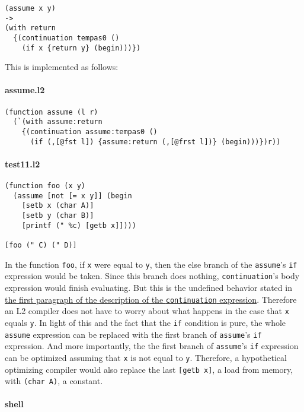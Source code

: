 \documentclass[]{article}
\let\oldparagraph\paragraph
\renewcommand{\paragraph}[1]{\oldparagraph{#1}\mbox{}}
\begin{document}
\begin{verbatim}
(assume x y)
->
(with return
  {(continuation tempas0 ()
    (if x {return y} (begin)))})
\end{verbatim}

This is implemented as follows:

\paragraph{assume.l2}\label{assume.l2}

\begin{verbatim}
(function assume (l r)
  (`(with assume:return
    {(continuation assume:tempas0 ()
      (if (,[@fst l]) {assume:return (,[@frst l])} (begin)))})r))
\end{verbatim}

\paragraph{test11.l2}\label{test11.l2}

\begin{verbatim}
(function foo (x y)
  (assume [not [= x y]] (begin
    [setb x (char A)]
    [setb y (char B)]
    [printf (" %c) [getb x]])))

[foo (" C) (" D)]
\end{verbatim}

In the function \texttt{foo}, if \texttt{x} were equal to \texttt{y},
then the else branch of the \texttt{assume}'s \texttt{if} expression
would be taken. Since this branch does nothing, \texttt{continuation}'s
body expression would finish evaluating. But this is the undefined
behavior stated in \protect\hyperlink{continuation}{the first paragraph
of the description of the \texttt{continuation} expression}. Therefore
an L2 compiler does not have to worry about what happens in the case
that \texttt{x} equals \texttt{y}. In light of this and the fact that
the \texttt{if} condition is pure, the whole \texttt{assume} expression
can be replaced with the first branch of \texttt{assume}'s \texttt{if}
expression. And more importantly, the the first branch of
\texttt{assume}'s \texttt{if} expression can be optimized assuming that
\texttt{x} is not equal to \texttt{y}. Therefore, a hypothetical
optimizing compiler would also replace the last \texttt{{[}getb\ x{]}},
a load from memory, with \texttt{(char\ A)}, a constant.

\paragraph{shell}\label{shell-10}
\end{document}
